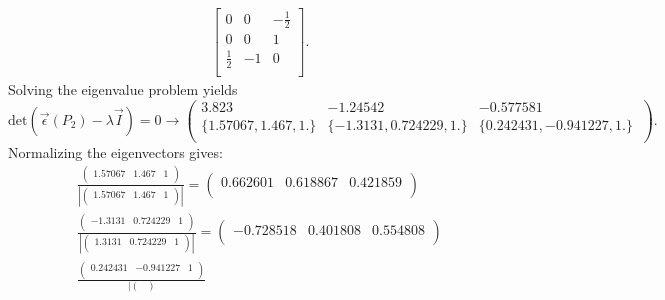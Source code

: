 \begin{derivation}
\begin{align*}
\begin{bmatrix}
        0 & 0 & -\frac{1}{2}\\
      0 & 0 & 1\\
      \frac{1}{2} & -1 & 0\\
      \end{bmatrix}
    .\end{align*}
    Solving the eigenvalue problem yields
    \begin{equation*}
      \mathrm{det}(\Vec{\epsilon}(P_2) - \lambda \Vec{I}) = 0 \rightarrow \left(
\begin{array}{ccc}
 3.823 & -1.24542 & -0.577581 \\
 \{1.57067,1.467,1.\} & \{-1.3131,0.724229,1.\} & \{0.242431,-0.941227,1.\}\
 
   \\
\end{array}
\right)
    .\end{equation*}
    Normalizing the eigenvectors gives:
    \begin{align*}
      \frac{\begin{pmatrix}
        \num{1,57067}  & \num{1,467}  & 1\\
      \end{pmatrix}}{\left| \begin{pmatrix}
        \num{1,57067}  & \num{1,467}  & 1\\
      \end{pmatrix} \right|} = \left(
\begin{array}{ccc}
 0.662601 & 0.618867 & 0.421859 \\
\end{array}
\right) \\
    \frac{\begin{pmatrix}
      -\num{1,3131}  & \num{0,724229}  & 1\\
    \end{pmatrix}}{\left| \begin{pmatrix}
      \num{1,3131}  & \num{0,724229}  & 1\\
    \end{pmatrix} \right|} = \left(
\begin{array}{ccc}
 -0.728518 & 0.401808 & 0.554808 \\
\end{array}
\right) \\
\frac{\begin{pmatrix}
  \num{0,242431}  & - \num{0,941227}  & 1\\
\end{pmatrix}}{\left| \begin{pmatrix}

\end{pmatrix}}
\end{align*}
\end{derivation}
